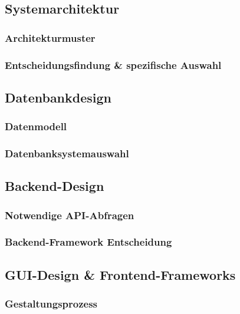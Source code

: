 \documentclass[../main.tex]{subfiles} %
\begin{document}
\subsection{Systemarchitektur} %

\subsubsection{Architekturmuster}

\subsubsection{Entscheidungsfindung \& spezifische Auswahl}

\subsection{Datenbankdesign} %

\subsubsection{Datenmodell}

\subsubsection{Datenbanksystemauswahl}

\subsection{Backend-Design} %

\subsubsection{Notwendige API-Abfragen}

\subsubsection{Backend-Framework Entscheidung}

\subsection{GUI-Design \& Frontend-Frameworks} %

\subsubsection{Gestaltungsprozess}
\end{document}
